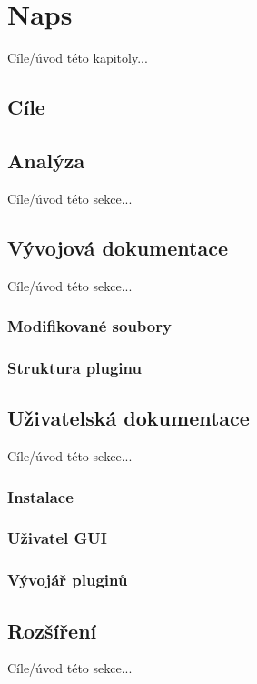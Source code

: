 \chapter{Naps}

Cíle/úvod této kapitoly...

\section{Cíle}

\section{Analýza}
Cíle/úvod této sekce...


\section{Vývojová dokumentace}
Cíle/úvod této sekce...

\subsection{Modifikované soubory}

\subsection{Struktura pluginu}

\section{Uživatelská dokumentace}
Cíle/úvod této sekce...

\subsection{Instalace}

\subsection{Uživatel GUI}

\subsection{Vývojář pluginů}

\section{Rozšíření}
Cíle/úvod této sekce...
